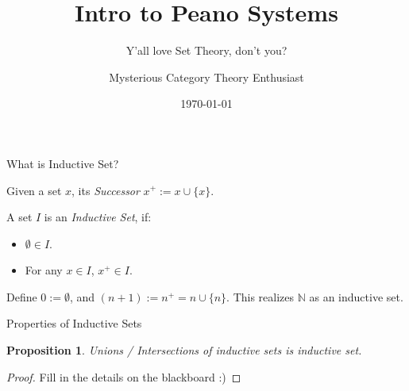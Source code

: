 \documentclass[10pt]{beamer}
\title{Intro to Peano Systems}
\subtitle{Y'all love Set Theory, don't you?}
\author{Mysterious Category Theory Enthusiast}
\date{\today}
\newtheorem{proposition}[theorem]{Proposition}
\begin{document}
\maketitle

\begin{frame}{What is Inductive Set?}
    \begin{definition}
        Given a set $x$, its \emph{Successor} $x^+:= x\cup \{x\}$. 
    \end{definition}

    \hfil

    \begin{definition}
        A set $I$ is an \emph{Inductive Set}, if:
        \begin{itemize}
            \item[1.] $\emptyset\in I$.
            \item[2.] For any $x\in I$, $x^+\in I$.
        \end{itemize}
    \end{definition}

    \hfil

    \begin{example}
        Define $0:= \emptyset$, and $(n+1):= n^+ = n\cup \{n\}$. This realizes $\mathbb{N}$ as an inductive set.
    \end{example}
\end{frame}



\begin{frame}{Properties of Inductive Sets}
    \begin{proposition}
        Unions / Intersections of inductive sets is inductive set.
    \end{proposition}

    \hfil

    \begin{proof}
        Fill in the details on the blackboard :)
    \end{proof}
\end{frame}
\end{document}
